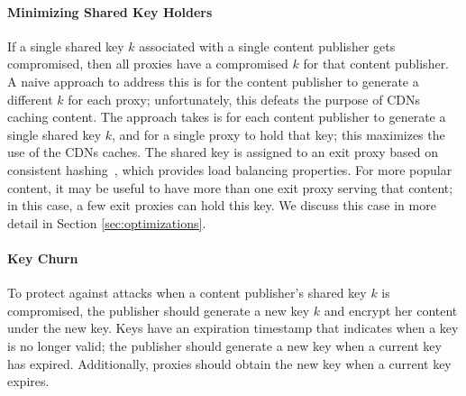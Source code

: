 \paragraph{Minimizing Shared Key Holders} If a single shared key $k$ associated with a single content publisher gets 
compromised, then all proxies have a compromised $k$ for that content publisher.  A naive approach to address this 
is for the content publisher to generate a different $k$ for each proxy; unfortunately, this defeats the purpose of 
CDNs caching content.  The approach \system{} takes is for each content publisher to generate a single shared key $k$, 
and for a single proxy to hold that key; this maximizes the use of the CDNs caches.  The shared key is assigned 
to an exit proxy based on consistent hashing~\cite{karger1997consistent,lewin1998consistent}, which provides load balancing properties. 
 For more popular 
content, it may be useful to have more than one exit proxy serving that content; in this case, a few exit proxies can 
hold this key.  We discuss this case in more detail in Section \ref{sec:optimizations}.

\paragraph{Key Churn} To protect against attacks when a content publisher's shared key $k$ is compromised, the publisher
should generate a new key $k$ and encrypt her content under the new key.  Keys have an expiration timestamp that indicates 
when a key is no longer valid; the publisher should generate a new key when a current key has expired.  Additionally, 
proxies should obtain the new key when a current key expires.  

